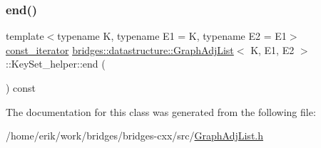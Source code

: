 \mbox{\label{classbridges_1_1datastructure_1_1_graph_adj_list_1_1_key_set__helper_a6204f2d6c81b2b4cc72387cbce6c4f0d}} 
\subsubsection{\texorpdfstring{end()}{end()}}
{\footnotesize\ttfamily template$<$typename K, typename E1 = K, typename E2 = E1$>$ \\
\hyperlink{classbridges_1_1datastructure_1_1_graph_adj_list_1_1_key_set__helper_1_1const__iterator}{const\+\_\+iterator} \hyperlink{classbridges_1_1datastructure_1_1_graph_adj_list}{bridges\+::datastructure\+::\+Graph\+Adj\+List}$<$ K, E1, E2 $>$\+::Key\+Set\+\_\+helper\+::end (\begin{DoxyParamCaption}{ }\end{DoxyParamCaption}) const\hspace{0.3cm}{\ttfamily [inline]}}



The documentation for this class was generated from the following file\+:\begin{DoxyCompactItemize}
\item 
/home/erik/work/bridges/bridges-\/cxx/src/\hyperlink{_graph_adj_list_8h}{Graph\+Adj\+List.\+h}\end{DoxyCompactItemize}

